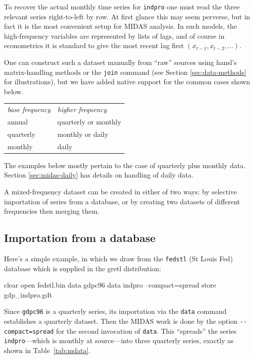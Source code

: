 To recover the actual monthly time series for \texttt{indpro} one must
read the three relevant series right-to-left by row. At first glance
this may seem perverse, but in fact it is the most convenient setup
for MIDAS analysis. In such models, the high-frequency variables are
represented by lists of lags, and of course in econometrics it is
standard to give the most recent lag first
$(x_{t-1}, x_{t-2}, \ldots)$.

One can construct such a dataset manually from ``raw'' sources using
hansl's matrix-handling methods or the \texttt{join} command (see
Section \ref{sec:data-methods} for illustrations), but we have added
native support for the common cases shown below.

\begin{center}
\begin{tabular}{ll}
\textit{base frequency} & \textit{higher frequency} \\[4pt]
annual    & quarterly or monthly \\
quarterly & monthly or daily \\
monthly   & daily
\end{tabular}
\end{center}

The examples below mostly pertain to the case of quarterly plus
monthly data. Section \ref{sec:midas-daily} has details on handling of
daily data.

A mixed-frequency dataset can be created in either of two ways: by
selective importation of series from a database, or by creating two
datasets of different frequencies then merging them.

\subsection{Importation from a database}
\label{sec:db-import}

Here's a simple example, in which we draw from the \texttt{fedstl} (St
Louis Fed) database which is supplied in the gretl distribution:
\begin{code}
clear
open fedstl.bin
data gdpc96
data indpro --compact=spread
store gdp_indpro.gdt
\end{code}

Since \texttt{gdpc96} is a quarterly series, its importation via the
\texttt{data} command establishes a quarterly dataset. Then the
MIDAS work is done by the option \verb|--compact=spread| for the
second invocation of \texttt{data}. This ``spreads'' the series
\texttt{indpro}---which is monthly at source---into three quarterly
series, exactly as shown in Table~\ref{tab:mdata}.

